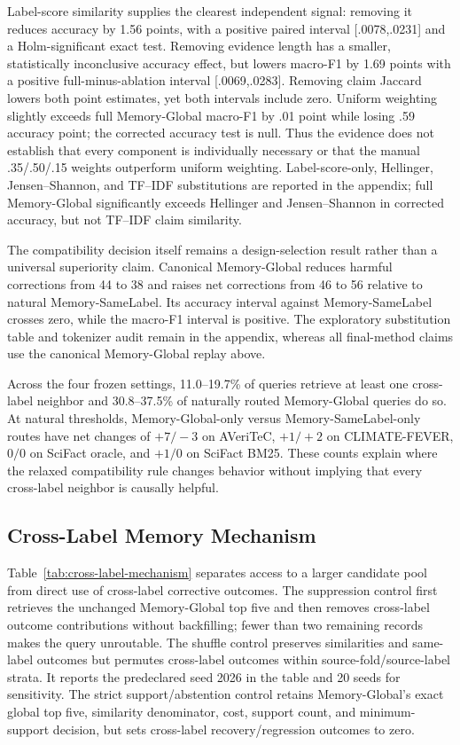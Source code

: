 \documentclass[runningheads]{llncs}
\begin{document}
Label-score similarity supplies the clearest independent signal: removing it
reduces accuracy by 1.56 points, with a positive paired interval
[.0078,.0231] and a Holm-significant exact test. Removing evidence length has
a smaller, statistically inconclusive accuracy effect, but lowers macro-F1 by
1.69 points with a positive full-minus-ablation interval [.0069,.0283]. Removing
claim Jaccard lowers both point estimates, yet both intervals include zero.
Uniform weighting slightly exceeds full Memory-Global macro-F1 by .01 point while losing .59
accuracy point; the corrected accuracy test is null. Thus the evidence does
not establish that every component is individually necessary or that the
manual .35/.50/.15 weights outperform uniform weighting. Label-score-only,
Hellinger, Jensen--Shannon, and TF--IDF substitutions are reported in the
appendix; full Memory-Global significantly exceeds Hellinger and Jensen--Shannon in corrected
accuracy, but not TF--IDF claim similarity.

The compatibility decision itself remains a design-selection result rather
than a universal superiority claim. Canonical Memory-Global reduces harmful corrections
from 44 to 38 and raises net corrections from 46 to 56 relative to natural
Memory-SameLabel. Its accuracy interval against Memory-SameLabel crosses zero, while the
macro-F1 interval is positive. The exploratory substitution table and tokenizer
audit remain in the appendix, whereas all final-method claims use the
canonical Memory-Global replay above.

Across the four frozen settings, 11.0--19.7\% of queries retrieve at least one
cross-label neighbor and 30.8--37.5\% of naturally routed Memory-Global queries do so.
At natural thresholds, Memory-Global-only versus Memory-SameLabel-only routes have net changes
of $+7/-3$ on AVeriTeC, $+1/+2$ on CLIMATE-FEVER, $0/0$ on SciFact oracle,
and $+1/0$ on SciFact BM25. These counts explain where the relaxed
compatibility rule changes behavior without implying that every cross-label
neighbor is causally helpful.

\subsection{Cross-Label Memory Mechanism}
\label{sec:cross-label-mechanism}

Table~\ref{tab:cross-label-mechanism} separates access to a larger candidate
pool from direct use of cross-label corrective outcomes. The suppression control first retrieves
the unchanged Memory-Global top five and then removes cross-label outcome contributions
without backfilling; fewer than two remaining records makes the query
unroutable. The shuffle control preserves similarities and same-label outcomes but permutes
cross-label outcomes within source-fold/source-label strata. It reports the
predeclared seed 2026 in the table and 20 seeds for sensitivity. The strict
support/abstention control retains Memory-Global's exact global top five,
similarity denominator, cost, support count, and minimum-support decision, but
sets cross-label recovery/regression outcomes to zero.
\end{document}
